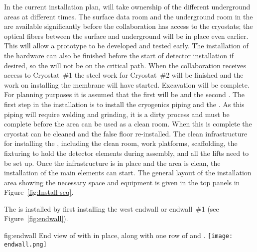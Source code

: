 In the current installation plan,  will take
ownership of the different underground areas at different times. The
surface data room and the underground room in the  are available
significantly before the collaboration has access to the cryostats; 
the optical fibers between the surface and underground will be in
place even earlier. This will allow a  prototype to be developed
and tested early. The installation of the  hardware can also be
finished before the start of detector installation if desired, so the
 will not be on the critical path.  When the collaboration receives
access to Cryostat~\#1 the steel work for Cryostat~\#2 will be
finished and the work on installing the membrane will have
started. Excavation will be complete.  For planning purposes it is
assumed that the first  will be  and the second
. The first step in the  installation is to
install the cryogenics piping and the . As this piping will
require welding and grinding, it is a dirty process and must be
complete before the area can be used as a clean room. When this is
complete the cryostat can be cleaned and the false floor
re-installed. The clean infrastructure for installing the ,
including the clean room, work platforms, scaffolding, the
fixturing to hold the detector elements during assembly, and all the
lifts need to be set up. Once the infrastructure is in place and the
area is clean, the installation of the main elements can start. The
general layout of the installation area showing the necessary space
and equipment is given in the top panels in Figure~\ref{fig:Install-seq}. 

The   is installed by first installing the west endwall or
endwall~\#1 (see Figure~\ref{fig:endwall}).

\begin{dunefigure}{fig:endwall}
  {End view of  with  in
  place, along with one row of  and .}
\texttt{[image: endwall.png]}
\end{dunefigure}

